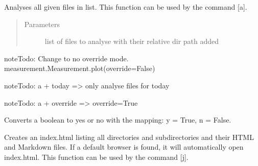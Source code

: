 \documentclass[letterpaper,10pt,english]{sphinxmanual}
\begin{document}
\begin{fulllineitems}
\label{\detokenize{pigor:pigor.analyse_files}}
Analyses all given files in list. This function can be used by the command {[}a{]}.
\begin{quote}\begin{description}
\item[{Parameters}] \leavevmode
{} \textendash{} list of files to analyse with
their relative dir path added

\end{description}\end{quote}

\begin{sphinxadmonition}{note}{\label{pigor:index-0}Todo:}
Change to no override mode. measurement.Measurement.plot(override=False)
\end{sphinxadmonition}

\begin{sphinxadmonition}{note}{\label{pigor:index-1}Todo:}
a + today =\textgreater{} only analyse files for today
\end{sphinxadmonition}

\begin{sphinxadmonition}{note}{\label{pigor:index-2}Todo:}
a + override =\textgreater{} override=True
\end{sphinxadmonition}

\end{fulllineitems}


\begin{fulllineitems}
\label{\detokenize{pigor:pigor.bool2yn}}
Converts a boolean to yes or no with the mapping: y = True, n = False.

\end{fulllineitems}


\begin{fulllineitems}
\label{\detokenize{pigor:pigor.create_index}}
Creates an index.html listing all directories and subdirectories and their HTML and Markdown files. If 
a default browser is found, it will automatically open index.html. This function can be used by the 
command {[}j{]}.

\end{fulllineitems}
\end{document}
